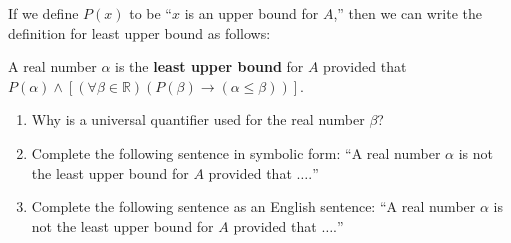 \begin{enumerate}
If we define  $P\left( x \right)$ to be ``$x$  is an upper bound for  $A$,'' then we can write the definition for least upper bound as follows:

A real number  $\alpha $ is the \textbf{least upper bound} for  $A$  provided that \\ $P\left( \alpha  \right) \wedge \left[ {\left( {\forall \beta  \in \mathbb{R}} \right)\left( {P\left( \beta  \right) \to \left( {\alpha  \leq \beta } \right)} \right)} \right]$.

\begin{enumerate}
  \item Why is a universal quantifier used for the real number  $\beta $?
  \item Complete the following sentence in symbolic form:  ``A real number  $\alpha $ is not the least upper bound for  $A$  provided that $ \ldots .$''
  \item Complete the following sentence as an English sentence:  ``A real number  
$\alpha $ is not the least upper bound for  $A$  provided that $ \ldots .$''
\end{enumerate}
\end{enumerate}
\hbreak
\endinput


  \item $\left( {\forall n \in \mathbb{N}} \right) \left[ \text{If } n \text{ is a perfect square, then } \left( {2^n  - 1} \right) \text{ is not a prime number} \right] $.





